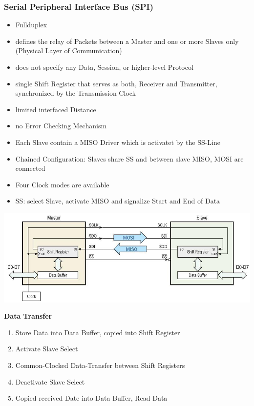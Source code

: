 \subsubsection{Serial Peripheral Interface Bus (\acs{SPI})} 
\begin{multicols}{2}
    \begin{itemize}
    	\item Fullduplex
    	\item defines the relay of Packets between a Master and one or more Slaves only (Physical Layer of Communication)
    	\item does not specify any Data, Session, or higher-level Protocol
    	\item single Shift Register that serves as both, Receiver and Transmitter, synchronized by the Transmission Clock
    	\item limited interfaced Distance
    	\item no Error Checking Mechanism
    	\item Each Slave contain a \acs{MISO} Driver which is activatet by the \acs{SS}-Line
    	\item Chained Configuration: Slaves share \acs{SS} and between slave \acs{MISO}, \acs{MOSI} are connected
    	\item Four Clock modes are available
    	\item \acs{SS}: select Slave, activate \acs{MISO} and signalize Start and End of Data
    \end{itemize}
\end{multicols}
\begin{minipage}{0.6\linewidth}
    \includegraphics[width=\linewidth]{images/spi}
\end{minipage}
\begin{minipage}{0.4\linewidth}
     \textbf{Data Transfer}
    \begin{enumerate}
    	\item Store Data into Data Buffer, copied into Shift Register
    	\item Activate Slave Select
    	\item Common-Clocked Data-Transfer between Shift Registers
    	\item Deactivate Slave Select
    	\item Copied received Date into Data Buffer, Read Data
    \end{enumerate}
\end{minipage}
\clearpage
\vspace{-1cm}
